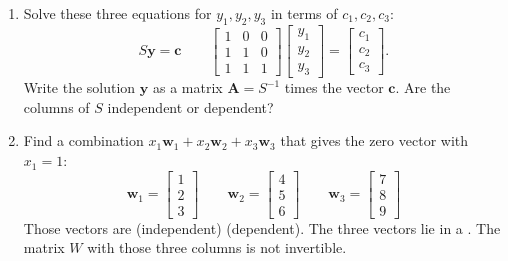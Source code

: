 \documentclass[14pt, a4paper]{article}
\begin{document}
\begin{enumerate}
    \item Solve these three equations for $y_1, y_2, y_3$ in terms of $c_1, c_2, c_3$:
          \[
              S\boldsymbol{y} = \boldsymbol{c} \qquad
              \begin{bmatrix}
                  1 & 0 & 0 \\
                  1 & 1 & 0 \\
                  1 & 1 & 1
              \end{bmatrix}
              \begin{bmatrix} y_1 \\ y_2 \\ y_3 \end{bmatrix}
              =
              \begin{bmatrix} c_1 \\ c_2 \\ c_3 \end{bmatrix}.
          \]
          Write the solution $\boldsymbol{y}$ as a matrix $\boldsymbol{A} = S^{-1}$ times the vector $\boldsymbol{c}$. Are the columns of $S$ independent or dependent?

    \item Find a combination $x_1\boldsymbol{w}_1 + x_2\boldsymbol{w}_2 + x_3\boldsymbol{w}_3$ that gives the zero vector with $x_1 = 1$:
          \[
              \boldsymbol{w}_1 = \begin{bmatrix} 1 \\ 2 \\ 3 \end{bmatrix} \quad\quad
              \boldsymbol{w}_2 = \begin{bmatrix} 4 \\ 5 \\ 6 \end{bmatrix} \quad\quad
              \boldsymbol{w}_3 = \begin{bmatrix} 7 \\ 8 \\ 9 \end{bmatrix}
          \]
          Those vectors are (independent) (dependent). The three vectors lie in a \underline{\hspace{2cm}}. The matrix $W$ with those three columns is not invertible.


\end{enumerate}
\end{document}
